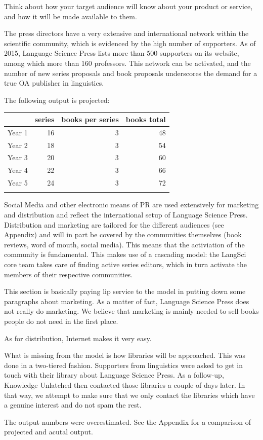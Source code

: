 \documentclass[output=guidelines,nonflat,smallfont,
draftmode
]{langsci/langscibook}
\newcommand{\background}[1]{ 
  \vspace{5mm}
  \renewcommand{\tblslinecolour}{lsDarkBlue}
  \tblssy[red]{explore2}{Background}{\vspace*{-5mm}#1}
}
\newcommand{\langscisolution}[1]{
  \renewcommand{\tblslinecolour}{lsLightBlue}
  \tblssy{langsci}{LangSci solution}{\vspace*{-5mm}#1}
}
\newcommand{\evaluation}[1]{
  \renewcommand{\tblslinecolour}{lsLightOrange}
  \tblssy{receipt}{Evaluation}{\vspace*{-5mm}#1}
}
\renewcommand{\tblssy}[4][black!12]{%
  \renewcommand{\langscisymbol}{#2}\renewcommand{\tblsboxcolor}{#1}
  \begin{mdframed}[style=yellowexercise,frametitle={#3}]
    #4
  \end{mdframed}
}
\begin{document}
\background{
Think about how your target audience will know about your product or service, and how it will be made available to them. 
}
\langscisolution{
The press directors have a very extensive and international network within the scientific community, which is evidenced by the high number of supporters. As of 2015, Language Science Press lists more than 500 supporters on its website, among which more than 160 professors. This network can be activated, and the number of new series proposals and book proposals underscores the demand for a true OA publisher in linguistics. 

The following output is projected:

\noindent
\begin{tabularx}{\textwidth}{Xrrr}
\lsptoprule
        & series &  books per series & books total   \\
\midrule         
Year 1 & 16      &  3                & 48              \\
Year 2 & 18      &  3                & 54              \\
Year 3 & 20      &  3                & 60              \\
Year 4 & 22      &  3                & 66              \\
Year 5 & 24      &  3                & 72              \\
\lspbottomrule
\end{tabularx}

Social Media and other electronic means of PR are used extensively for marketing and distribution and reflect the international setup of Language Science Press. Distribution and marketing are tailored for the different audiences (see Appendix) and will in part be covered by the communities themselves (book reviews, word of mouth, social media). This means that the activiation of the community is fundamental. This makes use of a cascading model: the LangSci core team takes care of finding active series editors, which in turn activate the members of their respective communities.  
}
\evaluation{
This section is basically paying lip service to the model in putting down some paragraphs about marketing. As a matter of fact, Language Science Press does not really do marketing. We believe that marketing is mainly needed to sell books people do not need in the first place. 

As for distribution, Internet makes it very easy.

What is missing from the model is how libraries will be approached. This was done in a two-tiered fashion. Supporters from linguistics were asked to get in touch with their library about Language Science Press. As a follow-up, Knowledge Unlatched then contacted those libraries a couple of days later. In that way, we attempt to make sure that we only contact the libraries which have a genuine interest and do not spam the rest.

The output numbers were overestimated. See the Appendix for a comparison of projected and acutal output. 
}
\end{document}
